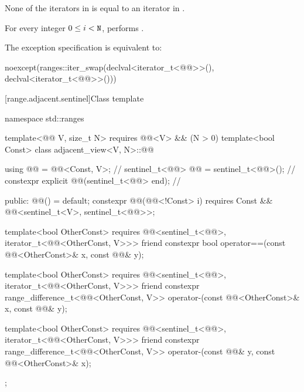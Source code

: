 \begin{itemdescr}
\pnum
\expects
None of the iterators in  is equal to
an iterator in .

\pnum
\effects
For every integer $0 \leq i < \texttt{\protect N}$,
performs
.

\pnum
\remarks
The exception specification is equivalent to:
\begin{codeblock}
noexcept(ranges::iter_swap(declval<iterator_t<@@>>(), declval<iterator_t<@@>>()))
\end{codeblock}
\end{itemdescr}

[range.adjacent.sentinel]{Class template }

\begin{codeblock}
namespace std::ranges {
  template<@@ V, size_t N>
    requires @@<V> && (N > 0)
  template<bool Const>
  class adjacent_view<V, N>::@@ {
    using @@ = @@<Const, V>;                         // \expos
    sentinel_t<@@> @@ = sentinel_t<@@>();                 // \expos
    constexpr explicit @@(sentinel_t<@@> end);          // \expos

  public:
    @@() = default;
    constexpr @@(@@<!Const> i)
      requires Const && @@<sentinel_t<V>, sentinel_t<@@>>;

    template<bool OtherConst>
      requires @@<sentinel_t<@@>, iterator_t<@@<OtherConst, V>>>
    friend constexpr bool operator==(const @@<OtherConst>& x, const @@& y);

    template<bool OtherConst>
      requires @@<sentinel_t<@@>, iterator_t<@@<OtherConst, V>>>
    friend constexpr range_difference_t<@@<OtherConst, V>>
      operator-(const @@<OtherConst>& x, const @@& y);

    template<bool OtherConst>
      requires @@<sentinel_t<@@>, iterator_t<@@<OtherConst, V>>>
    friend constexpr range_difference_t<@@<OtherConst, V>>
      operator-(const @@& y, const @@<OtherConst>& x);
  };
}
\end{codeblock}

